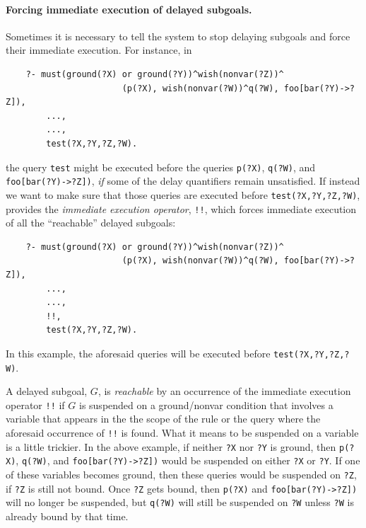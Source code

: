\documentclass[11pt]{article}
\newcommand{\ERGO}{\mbox{\smaller{\ensuremath{\cal{E}}\smaller{{\sc{RGO}}}}}\xspace}
\newcommand{\FLSYSTEM}{\ERGO}
\begin{document}
\paragraph{Forcing immediate execution of delayed subgoals.}
Sometimes it is necessary to tell the system to stop delaying
subgoals and force their immediate execution.
For instance, in
\begin{verbatim}
    ?- must(ground(?X) or ground(?Y))^wish(nonvar(?Z))^
                       (p(?X), wish(nonvar(?W))^q(?W), foo[bar(?Y)->?Z]),
        ...,
        ...,
        test(?X,?Y,?Z,?W).
\end{verbatim}
the query \texttt{test} might be executed before the queries \texttt{p(?X)},
\texttt{q(?W)}, and \texttt{foo[bar(?Y)->?Z])}, \emph{if} some of the
delay quantifiers remain unsatisfied. If instead we want
to make sure that those queries are executed before
\texttt{test(?X,?Y,?Z,?W)}, \FLSYSTEM provides the \emph{immediate execution
operator}, \texttt{!!},
which forces immediate execution of all the ``reachable'' delayed subgoals:
\begin{verbatim}
    ?- must(ground(?X) or ground(?Y))^wish(nonvar(?Z))^
                       (p(?X), wish(nonvar(?W))^q(?W), foo[bar(?Y)->?Z]),
        ...,
        ...,
        !!,
        test(?X,?Y,?Z,?W).
\end{verbatim}
In this example, the aforesaid queries will be executed before
\texttt{test(?X,?Y,?Z,?W)}. 

A delayed subgoal, $G$, is \emph{reachable} by an occurrence of
the immediate execution
operator \texttt{!!} 
if $G$ is suspended on a ground/nonvar condition that
involves a variable that appears in the the scope of the rule or the query
where the aforesaid occurrence of \texttt{!!} is found. 
What it means to be suspended on a variable is a little trickier.
In the above example, if neither \texttt{?X} nor \texttt{?Y} is ground,
then \texttt{p(?X)}, \texttt{q(?W)}, and \texttt{foo[bar(?Y)->?Z])} would
be suspended on either \texttt{?X} or \texttt{?Y}. If one of these
variables becomes ground, then these queries would be suspended on
\texttt{?Z}, if \texttt{?Z} is still not bound.  Once \texttt{?Z}  gets bound,
then \texttt{p(?X)} and \texttt{foo[bar(?Y)->?Z])} will no longer be
suspended, but \texttt{q(?W)} will still be suspended on \texttt{?W} unless
\texttt{?W} is already bound by that time.   
\end{document}

